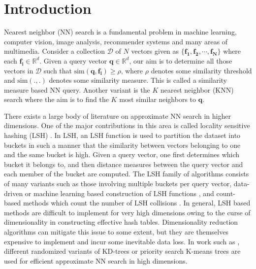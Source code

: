 \documentclass[sigconf, anonymous, review]{acmart}
\begin{document}

\maketitle

\section{Introduction}
Nearest neighbor (NN) search is a fundamental problem in machine learning, computer vision, image analysis, recommender systems and many areas of multimedia. Consider a collection $\mathcal{D}$ of $N$ vectors given as $\{\boldsymbol{f_1}, \boldsymbol{f_2}, \cdots, \boldsymbol{f_N}\}$ where each $\boldsymbol{f_i} \in \mathbb{R}^d$. Given a query vector $\boldsymbol{q} \in \mathbb{R}^d$, our aim is to determine all those 
vectors in $\mathcal{D}$ such that $\textrm{sim}(\boldsymbol{q},\boldsymbol{f_i}) \geq \rho$, where $\rho$ denotes some similarity threshold and $\textrm{sim}(.,.)$ denotes some similarity measure. This is called a similarity measure based NN query. Another variant is the $K$ nearest neighbor (KNN) search where the aim is to find the $K$ most similar neighbors to $\boldsymbol{q}$. 

There exists a large body of literature on approximate NN search in higher dimensions. One of the major contributions in this area is called locality sensitive hashing (LSH) \cite{Indyk1998}. In LSH, an LSH function is used to partition the dataset into buckets in such a manner that the similarity between vectors belonging to one and the same bucket is high. Given a query vector, one first determines which bucket it belongs to, and then distance measures between the query vector and each member of the bucket are computed. The LSH family of algorithms consists of many variants such as those involving multiple buckets per query vector, data-driven or machine learning based construction of LSH functions \cite{Andoni2015,Dong2019}, and count-based methods which count the number of LSH collisions \cite{Lv2007}. In general, LSH based methods are difficult to implement for very high dimensions owing to the curse of dimensionality in constructing effective hash tables. Dimensionality reduction algorithms can mitigate this issue to some extent, but they are themselves expensive to implement and incur some inevitable data loss. In work such as \cite{Ram2019,Muja2014}, different randomized variants of KD-trees or priority search K-means trees are used for efficient approximate NN search in high dimensions. 
\end{document}
